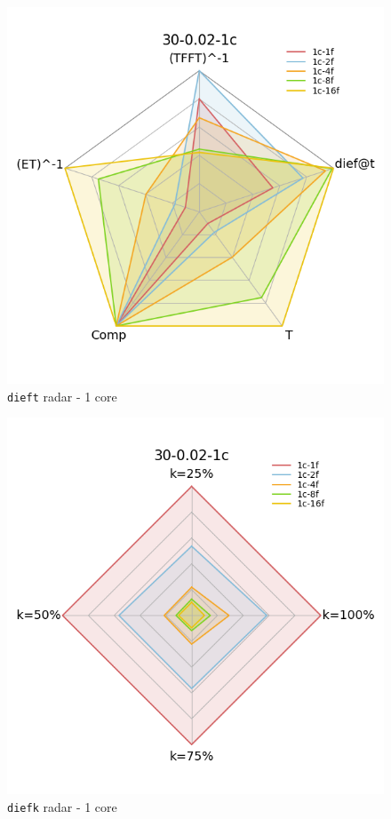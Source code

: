 \begin{figure}[H]
  \centering
  \includegraphics[scale = 0.5]{images/4-Experiments/E2/30-0.02-1c/radar-dieft.png}
  \caption{\texttt{dieft} radar - 1 core}
\end{figure}

\begin{figure}[H]
  \centering
  \includegraphics[scale = 0.5]{images/4-Experiments/E2/30-0.02-1c/radar-diefk.png}
  \caption{\texttt{diefk} radar - 1 core}
\end{figure}

